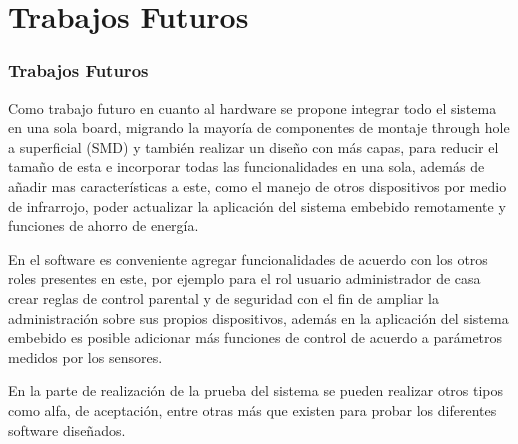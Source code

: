\section{Trabajos Futuros}
\begin{frame}[t]
\frametitle{Trabajos Futuros}
\small
Como trabajo futuro en cuanto al hardware se propone integrar todo el sistema en una sola board, migrando la mayoría de componentes de montaje through hole a superficial (SMD) y también realizar un diseño con más capas, para reducir el tamaño de esta e incorporar todas las funcionalidades en una sola, además de añadir mas características a este, como el manejo de otros dispositivos por medio de infrarrojo, poder actualizar la aplicación del sistema embebido remotamente y funciones de ahorro de energía.\newline

En el software es conveniente agregar funcionalidades de acuerdo con los otros roles presentes en este, por ejemplo para el rol usuario administrador de casa crear reglas de control parental y de seguridad con el fin de ampliar la administración sobre sus propios dispositivos, además en la aplicación del sistema embebido es posible adicionar más funciones de control de acuerdo a parámetros medidos por los sensores.\newline

En la parte de realización de la prueba del sistema se pueden realizar otros tipos como alfa, de aceptación, entre otras más que existen para probar los diferentes software diseñados.

\end{frame}